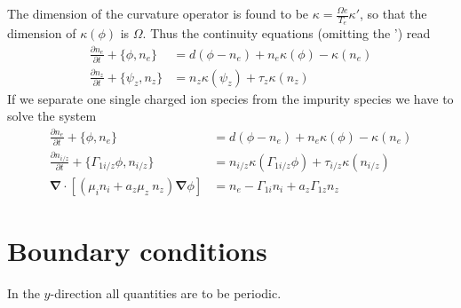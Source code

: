 \documentclass[a4paper,12pt]{scrartcl}
\renewcommand{\vec}[1]{{\mathbf{#1}}}
\begin{document}
The dimension of the curvature operator is found to be
$\kappa = \frac{\Omega e}{T_e}\kappa'$, 
so that the dimension of $\kappa(\phi)$ is $\Omega$.
Thus the continuity equations (omitting the ') read
\begin{subequations}
\begin{align}
    \frac{\partial n_e}{\partial t} + \{\phi, n_e\} &= d( \phi - n_e) + n_e\kappa(\phi) -
    \kappa(n_e) \\
    \frac{\partial n_z}{\partial t} + \{\psi_z, n_z\} &= n_z\kappa(\psi_z) +
    \tau_z\kappa(n_z) 
    \label{}
\end{align}
\end{subequations}
If we separate one single charged ion species from the impurity species we 
have to solve the system
\begin{subequations}
    \begin{align}
    \frac{\partial n_e}{\partial t} + \{\phi, n_e\} &= d( \phi - n_e) + n_e\kappa(\phi) -
    \kappa(n_e) \\
    \frac{\partial n_{i/z}}{\partial t} + \{\Gamma_{1i/z}\phi, n_{i/z}\} &= 
    n_{i/z}\kappa(\Gamma_{1i/z}\phi) + \tau_{i/z}\kappa(n_{i/z}) \\
    \vec \nabla\cdot\left[ (\mu_i n_i + a_z \mu_z\ n_z)\vec \nabla \phi \right] &= 
        n_e - \Gamma_{1i}n_i + a_z \Gamma_{1z} n_z
        \label{}
    \end{align}
    \label{}
\end{subequations}

\section{Boundary conditions}
In the $y$-direction all quantities are to be periodic.
\end{document}
